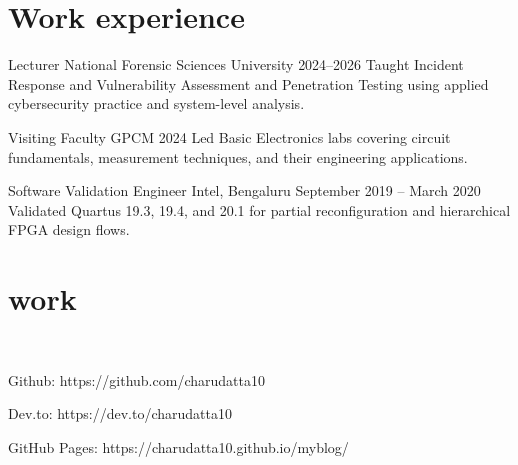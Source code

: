 \documentclass[fontsize=11pt]{tccv}
\begin{document}
\section{Work experience}
\begin{experience}
    \item{Lecturer}
    {National Forensic Sciences University}
    {2024--2026}
    {Taught Incident Response and Vulnerability Assessment and Penetration Testing using applied cybersecurity practice and system-level analysis.}
\end{experience}
\vspace{1em}
\begin{experience}
    \item{Visiting Faculty}
    {GPCM}
    {2024}
    {Led Basic Electronics labs covering circuit fundamentals, measurement techniques, and their engineering applications.}
\end{experience}
\vspace{1em}
\begin{experience}
    \item{Software Validation Engineer}
    {Intel, Bengaluru}
    {September 2019 -- March 2020}
    {Validated Quartus 19.3, 19.4, and 20.1 for partial reconfiguration and hierarchical FPGA design flows.}
\end{experience}
\vspace{1em}

\section{work}
\begin{skills}\\
\item {Github: https://github.com/charudatta10}\\
\item {Dev.to: https://dev.to/charudatta10}\\
\item {GitHub Pages: https://charudatta10.github.io/myblog/}\\
\end{skills}
\vspace{1em}
\end{document}
